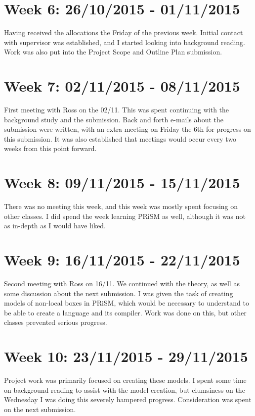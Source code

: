 \documentclass[11pt, a4paper]{article}
\begin{document}
\section{Week 6: 26/10/2015 - 01/11/2015}
Having received the allocations the Friday of the previous week. Initial
contact with supervisor was established, and I started looking into background
reading. Work was also put into the Project Scope and Outline Plan submission.

\section{Week 7: 02/11/2015 - 08/11/2015}
First meeting with Ross on the 02/11. This was spent continuing with the
background study and the submission. Back and forth e-mails about the submission
were written, with an extra meeting on Friday the 6th for progress on this
submission. It was also established that meetings would occur every two weeks
from this point forward.

\section{Week 8: 09/11/2015 - 15/11/2015}
There was no meeting this week, and this week was mostly spent focusing on other
classes. I did spend the week learning PRiSM as well, although it was not as
in-depth as I would have liked.

\section{Week 9: 16/11/2015 - 22/11/2015}
Second meeting with Ross on 16/11. We continued with the theory, as well as some
discussion about the next submission. I was given the task of creating models of
non-local boxes in PRiSM, which would be necessary to understand to be able to
create a language and its compiler. Work was done on this, but other classes
prevented serious progress.

\section{Week 10: 23/11/2015 - 29/11/2015}
Project work was primarily focused on creating these models. I spent some time
on background reading to assist with the model creation, but clumsiness on the
Wednesday I was doing this severely hampered progress. Consideration was spent
on the next submission.
\end{document}
